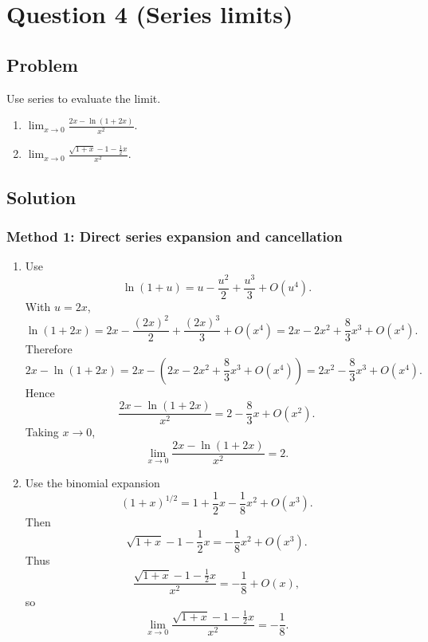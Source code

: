 \documentclass[12pt]{article}
\newcommand{\ds}{\displaystyle}
\begin{document}

\newpage
\section{Question 4 (Series limits)}

\subsection{Problem}
Use series to evaluate the limit.

\begin{enumerate}[label=(\alph*)]
  \item \(\ds \lim_{x\to 0}\frac{2x-\ln(1+2x)}{x^2}.\)
  \item \(\ds \lim_{x\to 0}\frac{\sqrt{1+x}-1-\frac12x}{x^2}.\)
\end{enumerate}


\bigskip
\subsection{Solution}

\subsubsection{Method 1: Direct series expansion and cancellation}

\begin{enumerate}[label=(\alph*)]

\item
Use
\[
\ln(1+u)=u-\frac{u^2}{2}+\frac{u^3}{3}+O(u^4).
\]
With \(u=2x\),
\[
\ln(1+2x)
=
2x-\frac{(2x)^2}{2}+\frac{(2x)^3}{3}+O(x^4)
=
2x-2x^2+\frac83x^3+O(x^4).
\]
Therefore
\[
2x-\ln(1+2x)
=
2x-\left(2x-2x^2+\frac83x^3+O(x^4)\right)
=
2x^2-\frac83x^3+O(x^4).
\]
Hence
\[
\frac{2x-\ln(1+2x)}{x^2}
=
2-\frac83x+O(x^2).
\]
Taking \(x\to0\),
\[
\boxed{
\lim_{x\to0}\frac{2x-\ln(1+2x)}{x^2}=2.
}
\]

\item
Use the binomial expansion
\[
(1+x)^{1/2}
=
1+\frac12x-\frac18x^2+O(x^3).
\]
Then
\[
\sqrt{1+x}-1-\frac12x
=
-\frac18x^2+O(x^3).
\]
Thus
\[
\frac{\sqrt{1+x}-1-\frac12x}{x^2}
=
-\frac18+O(x),
\]
so
\[
\boxed{
\lim_{x\to0}\frac{\sqrt{1+x}-1-\frac12x}{x^2}
=
-\frac18.
}
\]

\end{enumerate}

\newpage
\end{document}
